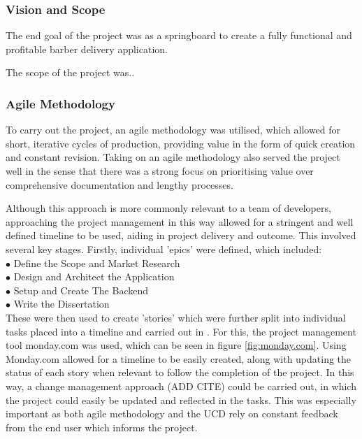 \documentclass[12pt]{article}
\begin{document}
	\subsubsection{Vision and Scope}
	The end goal of the project was as a springboard to create a fully functional and profitable barber delivery application.
	
	The scope of the project was..
	
	\subsubsection{Agile Methodology}
	To carry out the project, an agile methodology was utilised, which allowed for short, iterative cycles of production, providing value in the form of quick creation and constant revision. Taking on an agile methodology also served the project well in the sense that there was a strong focus on prioritising value over comprehensive documentation and lengthy processes. 
	
	Although this approach is more commonly relevant to a team of developers, approaching the project management in this way allowed for a stringent and well defined timeline to be used, aiding in project delivery and outcome. This involved several key stages.
	Firstly, individual 'epics' were defined, which included:
	\\
	$\bullet$ Define the Scope and Market Research
	\\
	$\bullet$ Design and Architect the Application
	\\
	$\bullet$ Setup and Create The Backend
	\\
	$\bullet$ Write the Dissertation
	\\
	
	These were then used to create 'stories' which were further split into individual tasks placed into a timeline and carried out in . For this, the project management tool monday.com \cite{MondayHome2021} was used, which can be seen in figure \ref{fig:monday.com}. Using Monday.com allowed for a timeline to be easily created, along with updating the status of each story when relevant to follow the completion of the project. In this way, a change management approach (ADD CITE) could be carried out, in which the project could easily be updated and reflected in the tasks. This was especially important as both agile methodology and the UCD rely on constant feedback from the end user which informs the project.
	
\end{document}
